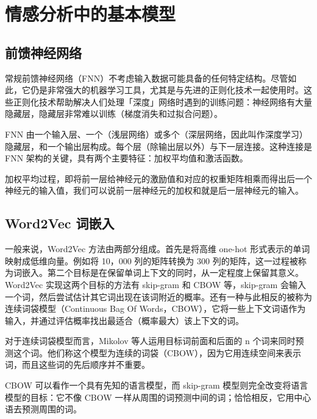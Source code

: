 \documentclass[lang=cn,11pt,a4paper]{elegantpaper}
\begin{document}
\section{情感分析中的基本模型}
\subsection{前馈神经网络}
常规前馈神经网络（FNN）不考虑输入数据可能具备的任何特定结构。尽管如此，它仍是非常强大的机器学习工具，尤其是与先进的正则化技术一起使用时。这些正则化技术帮助解决人们处理「深度」网络时遇到的训练问题：神经网络有大量隐藏层，隐藏层非常难以训练（梯度消失和过拟合问题）。

FNN 由一个输入层、一个（浅层网络）或多个（深层网络，因此叫作深度学习）隐藏层，和一个输出层构成。每个层（除输出层以外）与下一层连接。这种连接是 FNN 架构的关键，具有两个主要特征：加权平均值和激活函数。

加权平均过程，即将前一层给神经元的激励值和对应的权重矩阵相乘而得出后一个神经元的输入值，我们可以说前一层神经元的加权和就是后一层神经元的输入。

\subsection{Word2Vec 词嵌入}
一般来说，Word2Vec 方法由两部分组成。首先是将高维 one-hot 形式表示的单词映射成低维向量。例如将 10，000 列的矩阵转换为 300 列的矩阵，这一过程被称为词嵌入。第二个目标是在保留单词上下文的同时，从一定程度上保留其意义。Word2Vec 实现这两个目标的方法有 skip-gram 和 CBOW 等，skip-gram 会输入一个词，然后尝试估计其它词出现在该词附近的概率。还有一种与此相反的被称为连续词袋模型（Continuous Bag Of Words，CBOW），它将一些上下文词语作为输入，并通过评估概率找出最适合（概率最大）该上下文的词。

对于连续词袋模型而言，Mikolov 等人运用目标词前面和后面的 n 个词来同时预测这个词。他们称这个模型为连续的词袋（CBOW），因为它用连续空间来表示词，而且这些词的先后顺序并不重要。

CBOW 可以看作一个具有先知的语言模型，而 skip-gram 模型则完全改变将语言模型的目标：它不像 CBOW 一样从周围的词预测中间的词；恰恰相反，它用中心语去预测周围的词。



\end{document}
